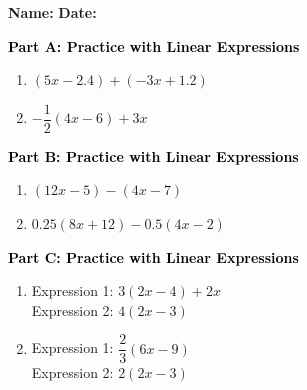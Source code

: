 \documentclass[12pt, letterpaper, fleqn]{article}
\begin{document}
\textbf{Name:} \underline{\hspace{5cm}}
\hfill
\textbf{Date:} \underline{\hspace{3cm}}\\

\begin{tcolorbox}[colback=customteal!20]
\large\textcolor{black}{\textbf{Part A: Practice with Linear Expressions}}
\end{tcolorbox}

\vspace{3mm}

\begin{enumerate}[itemsep=4.2cm, leftmargin=0.6cm]
\item $(5x - 2.4) + (-3x + 1.2)$
\item $-\dfrac{1}{2}(4x - 6) + 3x$
\end{enumerate}

\newpage

\begin{tcolorbox}[colback=customteal!20]
\large\textcolor{black}{\textbf{Part B: Practice with Linear Expressions}}
\end{tcolorbox}

\vspace{3mm}

\begin{enumerate}[itemsep=4.2cm, leftmargin=0.6cm, resume]
\item $(12x - 5) - (4x - 7)$
\item $0.25(8x + 12) - 0.5(4x - 2)$
\end{enumerate}

\newpage

\begin{tcolorbox}[colback=customteal!20]
\large\textcolor{black}{\textbf{Part C: Practice with Linear Expressions}}
\end{tcolorbox}

\vspace{3mm}

\begin{enumerate}[itemsep=4.2cm, leftmargin=0.6cm, resume]
\item Expression 1: $3(2x - 4) + 2x$ \\
Expression 2: $4(2x - 3)$
\item Expression 1: $\dfrac{2}{3}(6x - 9)$ \\
Expression 2: $2(2x - 3)$
\end{enumerate}
\end{document}
